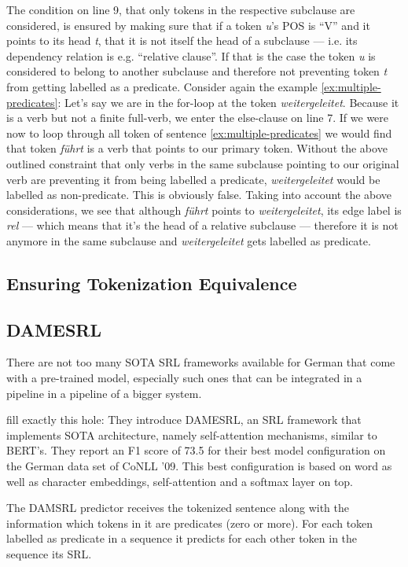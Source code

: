 The condition on line 9, that only tokens in the respective subclause are considered, is ensured by making sure that if a token \textit{u}'s POS is ``V'' and it points to its head \textit{t}, that it is not itself the head of a subclause --- i.e. its dependency relation is e.g. ``relative clause''.
If that is the case the token \textit{u} is considered to belong to another subclause and therefore not preventing token \textit{t} from getting labelled as a predicate.
Consider again the example \ref{ex:multiple-predicates}: 
Let's say we are in the for-loop at the token \textit{weitergeleitet}.
Because it is a verb but not a finite full-verb, we enter the else-clause on line 7.
If we were now to loop through all token of sentence \ref{ex:multiple-predicates} we would find that token \textit{führt} is a verb that points to our primary token.
Without the above outlined constraint that only verbs in the same subclause pointing to our original verb are preventing it from being labelled a predicate, \textit{weitergeleitet} would be labelled as non-predicate.
This is obviously false.
Taking into account the above considerations, we see that although \textit{führt} points to \textit{weitergeleitet}, its edge label is \textit{rel} --- which means that it's the head of a relative subclause --- therefore it is not anymore in the same subclause and \textit{weitergeleitet} gets labelled as predicate.

\subsection{Ensuring Tokenization Equivalence}

\subsection{DAMESRL}

There are not too many SOTA SRL frameworks available for German that come with a pre-trained model, especially such ones that can be integrated in a pipeline in a pipeline of a bigger system.

\cite{do2018flexible} fill exactly this hole: They introduce DAMESRL, an SRL framework that implements SOTA architecture, namely self-attention mechanisms, similar to BERT's.
They report an F1 score of 73.5 for their best model configuration on the German data set of CoNLL '09.
This best configuration is based on word as well as character embeddings, self-attention and a softmax layer on top.

The DAMSRL predictor receives the tokenized sentence along with the information which tokens in it are predicates (zero or more).
For each token labelled as predicate in a sequence it predicts for each other token in the sequence its SRL.

